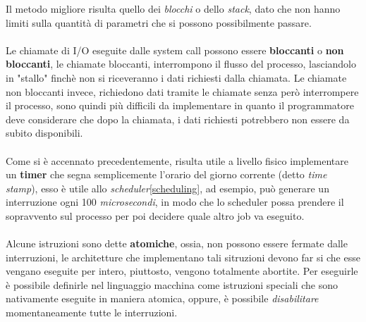 \documentclass[12pt, letterpaper]{article}
\begin{document}
Il metodo migliore risulta quello dei \textit{blocchi} o dello \textit{stack}, dato che non hanno limiti sulla 
quantità di parametri che si possono possibilmente passare.\\\hphantom{.}\\
Le chiamate di I/O eseguite dalle system call possono essere \textbf{bloccanti} o \textbf{non bloccanti},
le chiamate bloccanti, interrompono il flusso del processo, lasciandolo in "stallo" finchè non si
riceveranno i dati richiesti dalla chiamata. Le chiamate non bloccanti invece, richiedono dati tramite 
le chiamate senza però interrompere il processo, sono quindi più difficili da implementare in quanto 
il programmatore deve considerare che dopo la chiamata, i dati richiesti potrebbero non essere 
da subito disponibili.\\\hphantom{.}\\
Come si è accennato precedentemente, risulta utile a livello fisico implementare un \textbf{timer} che 
segna semplicemente l'orario del giorno corrente (detto \textit{time stamp}), esso è utile allo 
\textit{scheduler}\ref{scheduling}, ad esempio, può generare un interruzione ogni 100 \textit{microsecondi}, in modo che 
lo scheduler possa prendere il sopravvento sul processo per poi decidere quale altro job va eseguito.\\\hphantom{.}\\
Alcune istruzioni sono dette \textbf{atomiche}, ossia, non possono essere fermate dalle interruzioni, le architetture 
che implementano tali sitruzioni devono far si che esse vengano eseguite per intero, piuttosto, vengono
totalmente abortite. Per eseguirle è possibile definirle nel linguaggio macchina come istruzioni speciali 
che sono nativamente eseguite in maniera atomica, oppure, è possibile \textit{disabilitare} momentaneamente 
tutte le interruzioni.
\end{document}
